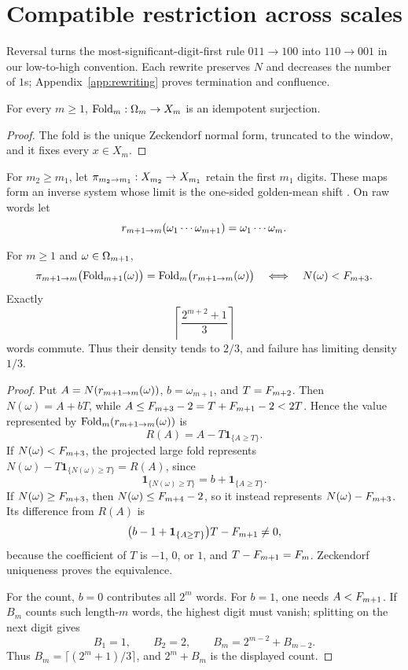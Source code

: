 \section{Compatible restriction across scales}
\label{sec:multiscale}

Reversal turns the most-significant-digit-first rule \(011\to100\) into \(110\to001\) in our low-to-high convention. Each rewrite preserves \(N\) and decreases the number of \(1\)s; Appendix~\ref{app:rewriting} proves termination and confluence.

\begin{proposition}\label{prop:idempotent}
For every \(m\ge1\), \(\mathrm{Fold}_m:\Omega_m\to X_m\) is an idempotent surjection.
\end{proposition}

\begin{proof}
The fold is the unique Zeckendorf normal form, truncated to the window, and it fixes every \(x\in X_m\).
\end{proof}

For \(m_2\ge m_1\), let \(\pi_{m_2\to m_1}:X_{m_2}\to X_{m_1}\) retain the first \(m_1\) digits. These maps form an inverse system whose limit is the one-sided golden-mean shift \cite[Chapter~1]{LindMarcus1995}. On raw words let
\[
r_{m+1\to m}(\omega_1\cdots\omega_{m+1})=\omega_1\cdots\omega_m.
\]

\begin{proposition}\label{prop:sharp-commutation}
For \(m\ge1\) and \(\omega\in\Omega_{m+1}\),
\[
\pi_{m+1\to m}\bigl(\mathrm{Fold}_{m+1}(\omega)\bigr)
=\mathrm{Fold}_m\bigl(r_{m+1\to m}(\omega)\bigr)
\quad\Longleftrightarrow\quad N(\omega)<F_{m+3}.
\]
Exactly
\[
\left\lceil\frac{2^{m+2}+1}{3}\right\rceil
\]
words commute. Thus their density tends to \(2/3\), and failure has limiting density \(1/3\).
\end{proposition}

\begin{proof}
Put \(A=N(r_{m+1\to m}(\omega))\), \(b=\omega_{m+1}\), and \(T=F_{m+2}\). Then \(N(\omega)=A+bT\), while \(A\le F_{m+3}-2=T+F_{m+1}-2<2T\). Hence the value represented by \(\mathrm{Fold}_m(r_{m+1\to m}(\omega))\) is
\[
R(A)=A-T\mathbf 1_{\{A\ge T\}}.
\]
If \(N(\omega)<F_{m+3}\), the projected large fold represents \(N(\omega)-T\mathbf 1_{\{N(\omega)\ge T\}}=R(A)\), since
\[
\mathbf 1_{\{N(\omega)\ge T\}}=b+\mathbf 1_{\{A\ge T\}}.
\]
If \(N(\omega)\ge F_{m+3}\), then \(N(\omega)\le F_{m+4}-2\), so it instead represents \(N(\omega)-F_{m+3}\). Its difference from \(R(A)\) is
\[
\bigl(b-1+\mathbf 1_{\{A\ge T\}}\bigr)T-F_{m+1}\ne0,
\]
because the coefficient of \(T\) is \(-1\), \(0\), or \(1\), and \(T-F_{m+1}=F_m\). Zeckendorf uniqueness proves the equivalence.

For the count, \(b=0\) contributes all \(2^m\) words. For \(b=1\), one needs \(A<F_{m+1}\). If \(B_m\) counts such length-\(m\) words, the highest digit must vanish; splitting on the next digit gives
\[
B_1=1,\qquad B_2=2,\qquad B_m=2^{m-2}+B_{m-2}.
\]
Thus \(B_m=\lceil(2^m+1)/3\rceil\), and \(2^m+B_m\) is the displayed count.
\end{proof}

